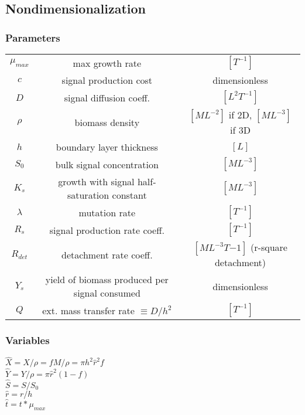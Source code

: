 \documentclass[11pt]{amsart}
\begin{document}
		\subsection{Nondimensionalization}

			\subsubsection{Parameters}
			\begin{center}
				\renewcommand{\arraystretch}{2}
				\begin{tabular}{c | c | c }
					\(\mu_{max}\) & max growth rate & \([T^{-1}]\) \\
					\(c\) & signal production cost & dimensionless \\
					\(D\) & signal diffusion coeff. & \([L^2T^{-1}]\) \\
					\(\rho\) & biomass density & \([ML^{-2}]\) if 2D, \([ML^{-3}]\) if 3D \\
					\(h\) & boundary layer thickness & \([L]\) \\
					\(S_0\) & bulk signal concentration & \([ML^{-3}]\) \\
					\(K_s\) & growth with signal half-saturation constant & \([ML^{-3}]\) \\
					\(\lambda\) & mutation rate & \([T^{-1}]\) \\
					\(R_s\) & signal production rate coeff. & \([T^{-1}]\) \\
					\(R_{det}\) & detachment rate coeff. & \([ML^{-3}T{-1}]\) (r-square detachment)\\
					\(Y_s\) & yield of biomass produced per signal consumed & dimensionless \\
					\(Q\) & ext. mass transfer rate \( \equiv D/h^2 \) & \([T^{-1}]\) \\
				\end{tabular}
				
			\end{center}

		\subsubsection{Variables} 
			\begin{center}
				\(\hat{X} = X / \rho =fM/\rho = \pi h^2 \hat{r}^2f\) \\
				\(\hat{Y} = Y / \rho  =\pi\hat{r}^2(1-f)\)\\
				\(\hat{S} = S / S_0\) \\
				\(\hat{r} = r / h\) \\
				\(\hat{t} = t * \mu_{max}\)
			\end{center}
\end{document}
